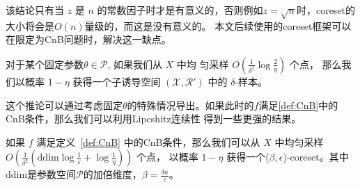 该结论只有当 $z$ 是 $n$ 的常数因子时才是有意义的，否则例如$z=\sqrt n$时，coreset的大小将会是$O(n)$量级的，而这是没有意义的。
本文后续使用的coreset框架可以在限定为CnB问题时，解决这一缺点。
\begin{corollary}
    对于某个固定参数$\theta \in \mathcal{P}$, 如果我们从 $X$ 中均
    匀采样 $O\left(\frac{1}{\delta^2}  \log \frac{2}{\eta}\right)$ 个点，
    那么我们以概率 $1 - \eta$ 获得一个子诱导空间 $(\mathcal{X}, \mathcal{R}')$ 中的 $\delta$-样本。
    \label{cor:fixed theta}
\end{corollary}   

这个推论可以通过考虑固定$\theta$的特殊情况导出。如果此时的$f$满足\ref{def:CnB}中的CnB条件，那么我们可以利用Lipcshitz连续性
得到一些更强的结果。

\begin{theorem}
    如果 $f$ 满足定义~\ref{def:CnB} 中的CnB条件，那么我们可以从 $X$ 中均匀采样 $O\left(\frac{1}{\delta^2} \left(\text{ddim}\log \frac 1 \varepsilon + \log \frac{1}{\eta}\right)\right)$ 个点，
    以概率 $1 - \eta$ 获得一个($\beta, \epsilon$)-coreset。其中$\text{ddim}$是参数空间$\mathcal{P}$的加倍维度，$\beta = \frac{\delta n}{z}$。
    \label{thm:uniform}
\end{theorem}
